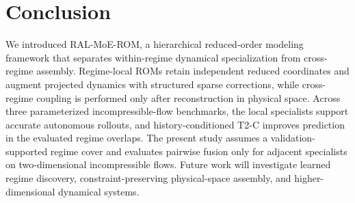 \section{Conclusion}

We introduced RAL-MoE-ROM, a hierarchical reduced-order modeling framework that separates within-regime dynamical specialization from cross-regime assembly. Regime-local ROMs retain independent reduced coordinates and augment projected dynamics with structured sparse corrections, while
cross-regime coupling is performed only after reconstruction in physical space. Across three parameterized incompressible-flow benchmarks, the local specialists support accurate autonomous rollouts, and history-conditioned T2-C improves prediction in the evaluated regime overlaps. The present study assumes a validation-supported regime cover and evaluates pairwise fusion only for adjacent specialists on two-dimensional incompressible flows. Future work will investigate learned regime discovery, constraint-preserving physical-space assembly, and higher-dimensional dynamical systems.
